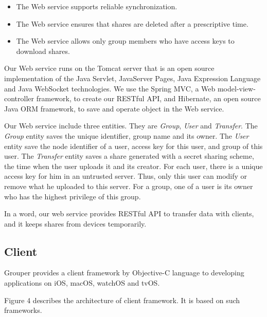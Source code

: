 \documentclass[twocolumn,10pt]{article}
\begin{document}
\begin{itemize}
	\setlength{\itemsep}{1pt}
	\setlength{\parskip}{0pt}
	\setlength{\parsep}{0pt}
	\item The Web service supports reliable synchronization.
	\item The Web service ensures that shares are deleted after a prescriptive time.
	\item The Web service allows only group members who have access keys to download shares.
\end{itemize}

Our Web service runs on the Tomcat server that is an open source implementation of the Java Servlet, JavaServer Pages, Java Expression Language and Java WebSocket technologies. We use the Spring MVC, a  Web model-view-controller framework, to create our RESTful API, and Hibernate, an open source Java ORM framework, to save and operate object in the Web service. 

Our Web service include three entities. They are \emph{Group}, \emph{User} and \emph{Transfer}. The \emph{Group} entity saves the unique identifier, group name and its owner. The \emph{User} entity save the node identifier of a user, access key for this user, and group of this user. The \emph{Transfer} entity saves a share generated with a secret sharing scheme, the time when the user uploads it and its creator. For each user, there is a unique access key for him in an untrusted server. Thus, only this user can modify or remove what he uploaded to this server. For a group, one of a user is its owner who has the highest privilege of this group.

In a word, our web service provides RESTful API to transfer data with clients, and it keeps shares from devices temporarily.

\subsection{Client}

Grouper provides a client framework by Objective-C language to developing applications on iOS, macOS, watchOS and tvOS. 
 
Figure 4 describes the architecture of client framework. It is based on such frameworks.   
\end{document}
